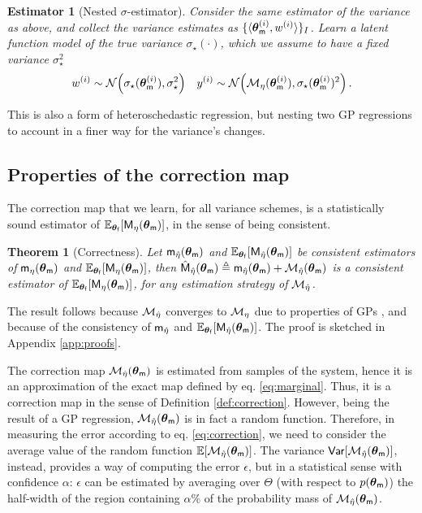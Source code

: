 \documentclass[runningheads,a4paper]{llncs}
\newtheorem{myth}{Theorem}
\newtheorem{est}{Estimator}
\newcommand{\bM}{{\sf{M}}}
\newcommand{\ebM}{{\hat{\sf{M}}}}
\newcommand{\bm}{{\sf{m}}}
\newcommand{\pfpar}{\bth_{\sf{f}}}
\newcommand{\pmpar}{\bth_{\sf{m}}}
\newcommand{\rarg}[1]{{\bth_{\bm}^{(#1)}}}
\newcommand{\tstat}{\eta} %
\newcommand{\stat}{{\hat{\eta}}} %
\newcommand{\tmap}{{{\cal M}_\tstat}}
\newcommand{\map}{{{\cal M}_\stat}}
\newcommand{\bth}{\boldsymbol{\theta}}
\newcommand{\var}{{\sf Var}}
\begin{document}
\begin{est}[Nested $\sigma$-estimator] Consider the same estimator of the variance as above,  and collect the variance estimates as $\{ \langle {\bth_{\bm}^{(i)}}, w^{(i)} \rangle\}_I$.  Learn  a latent function model of the true variance $\sigma_\star(\cdot)$, which we assume to have a fixed variance $\sigma_\star^2$
\begin{align}\label{eq:regvar}
w^{(i)} \sim {\cal N}\Big ( \sigma_\star(\rarg{i}),   \sigma_\star^2 \Big) &&
y^{(i)} \sim {\cal N}\Big (\tmap(\rarg{i}),   \sigma_\star(\rarg{i})^2\Big) \, .
\end{align}
\end{est}
This is also a form of heteroschedastic regression, but nesting two GP regressions to account in a finer way for the variance's changes.


\subsection{Properties of the correction map}

The correction map that we learn, for all variance schemes, is a statistically sound estimator of $\mathbb{E}_{\pfpar}[\bM_{\tstat}(\pmpar)]$, in the sense of being consistent. 

\begin{myth}[Correctness] Let $\bm_{\stat}(\bth_{\bm})$ and $\mathbb{E}_{\pfpar}[\bM_{\stat}(\pmpar)]$ be consistent estimators of $\bm_{\tstat}(\bth_{\bm})$ and $\mathbb{E}_{\pfpar}[\bM_{\tstat}(\pmpar)]$, then $\ebM_{\stat}(\bth_{\bm})  \triangleq \bm_{\stat}(\bth_{\bm}) + {\map}(\bth_{\bm})$ is a consistent estimator of  $\mathbb{E}_{\pfpar}[\bM_{\tstat}(\pmpar)]$, for any estimation strategy of $\map$.
\end{myth}
The result follows because $\map$ converges to $\tmap$ due to properties of GPs \cite{RASMUSSEN}, and because of the consistency of $\bm_{\stat}$ and $\mathbb{E}_{\pfpar}[\bM_{\stat}(\pmpar)]$. The proof is sketched in Appendix \ref{app:proofs}.


The correction map ${\map}(\bth_{\bm})$ is estimated from samples of the system, hence it is  an approximation of the exact map defined by eq. \eqref{eq:marginal}. Thus, it is a correction map in the sense of Definition \ref{def:correction}. However, being the result of a GP regression, ${\map}(\bth_{\bm})$ is in fact a random function. Therefore, in measuring the error according to eq. \eqref{eq:correction}, we need to consider the average value of the random function $\mathbb{E}[{\map}(\bth_{\bm})]$. The variance  $\var[{\map}(\bth_{\bm})]$, instead, provides a way of computing the error $\epsilon$, but in a statistical sense with confidence $\alpha$: $\epsilon$ can be estimated by averaging over $\Theta$ (with respect to $p(\pmpar)$) the half-width of the region containing $\alpha$\% of the probability mass of  ${\map}(\bth_{\bm})$.
\end{document}
